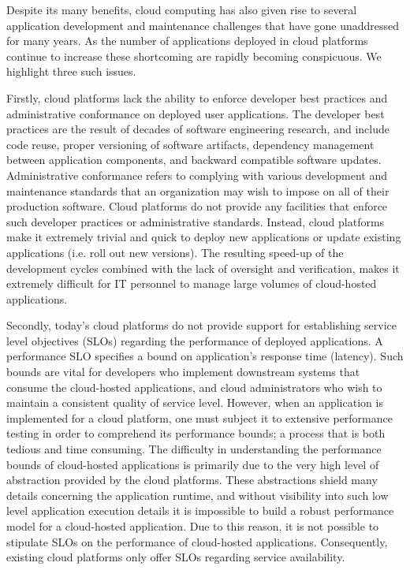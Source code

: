 Despite its many benefits, cloud computing has also given rise to several application
development and maintenance challenges that have gone unaddressed for many years.
As the number of applications deployed in cloud platforms continue to increase these
shortcoming are rapidly becoming conspicuous. We highlight three such issues.
 
Firstly, cloud platforms lack the ability to enforce developer best practices
and administrative conformance on deployed user applications. The developer best practices 
are the result of decades of software engineering research, and
include code reuse, proper versioning of software artifacts, dependency management
between application components, and backward compatible software updates. Administrative
conformance refers to complying with various development and maintenance standards
that an organization may wish to impose on all of their production software.
Cloud platforms do not provide any facilities that enforce such developer practices or
administrative standards. Instead, cloud platforms
make it extremely trivial and quick to deploy new applications or update existing
applications (i.e. roll out new versions). The resulting speed-up of the development cycles combined with the lack of 
oversight and verification, makes it extremely difficult for 
IT personnel to manage large volumes of cloud-hosted applications.

Secondly, today's cloud platforms do not provide support for establishing 
service level objectives (SLOs) regarding the performance of deployed applications.
A performance SLO specifies a bound on application's response time (latency). 
Such bounds are vital for developers 
who implement downstream systems that consume the cloud-hosted applications,
and cloud administrators who wish to maintain a consistent quality of service
level. However, when an application is implemented for
a cloud platform, one must subject it to extensive performance testing in order
to comprehend its performance bounds; a process that is both 
tedious and time consuming. The difficulty in understanding the performance 
bounds of cloud-hosted applications is primarily due to the very high level of 
abstraction provided by the cloud platforms. These abstractions shield many details 
concerning the application runtime, and without visibility into such low level application 
execution details it is impossible
to build a robust performance model for a cloud-hosted application. Due to this
reason, it is not possible to stipulate SLOs on the performance of cloud-hosted applications. 
Consequently, existing cloud platforms only offer SLOs regarding service availability.


